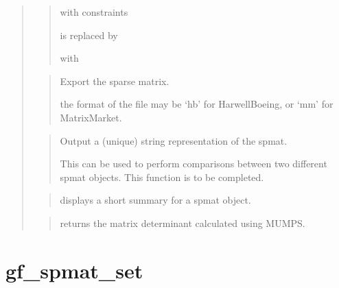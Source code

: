 \documentclass[a4paper,11pt,english]{sphinxmanual}
\begin{document}
\begin{quote}
\begin{quote}
 with constraints 

is replaced by

 with 
\end{quote}

\begin{quote}

Export the sparse matrix.

the format of the file may be ‘hb’ for Harwell\sphinxhyphen{}Boeing, or ‘mm’
for Matrix\sphinxhyphen{}Market.
\end{quote}

\begin{quote}

Output a (unique) string representation of the spmat.

This can be used to perform comparisons between two
different spmat objects.
This function is to be completed.
\end{quote}

\begin{quote}

displays a short summary for a spmat object.
\end{quote}

\begin{quote}

returns the matrix determinant calculated using MUMPS.
\end{quote}
\end{quote}


\section{gf\_spmat\_set}
\label{\detokenize{matlab_octave/cmdref_gf_spmat_set:gf-spmat-set}}\label{\detokenize{matlab_octave/cmdref_gf_spmat_set::doc}}
\end{document}
